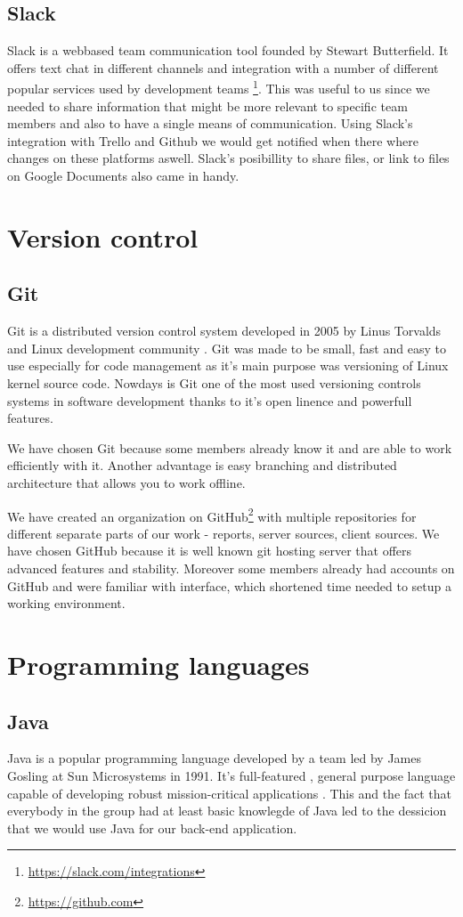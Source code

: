 \documentclass[11pt,a4paper,titlepage,oneside]{report}
\begin{document}
  \subsection{Slack}
Slack is a webbased team communication tool founded by Stewart Butterfield. It offers text chat in different channels and integration with a number of different popular services used by development teams \footnote{\url{https://slack.com/integrations}}. This was useful to us since we needed to share information that might be more relevant to specific team members and also to have a single means of communication. Using Slack's integration with Trello and Github we would get notified when there where changes on these platforms aswell. Slack's posibillity to share files, or link to files on Google Documents also came in handy.

\section{Version control}
  \subsection{Git}
  Git is a distributed version control system developed in 2005 by Linus Torvalds and Linux development community \cite{ProGit}. Git was made to be small, fast and easy to use especially for code management as it's main purpose was versioning of Linux kernel source code. Nowdays is Git one of the most used versioning controls systems in software development thanks to it's open linence and powerfull features.

  We have chosen Git because some members already know it and are able to work efficiently with it. Another advantage is easy branching and distributed architecture that allows you to work offline. 
  
  We have created an organization on GitHub\footnote{\url{https://github.com}} with multiple repositories for different separate parts of our work - reports, server sources, client sources. We have chosen GitHub because it is well known git hosting server that offers advanced features and stability. Moreover some members already had accounts on GitHub and were familiar with interface, which shortened time needed to setup a working environment.

\section{Programming languages}
  \subsection{Java}
  Java is a popular programming language developed by a team led by James Gosling at Sun Microsystems in 1991. It's full-featured , general purpose language capable of developing robust mission-critical applications \cite{liang}. This and the fact that everybody in the group had at least basic knowlegde of Java led to the dessicion that we would use Java for our back-end application.  
\end{document}
